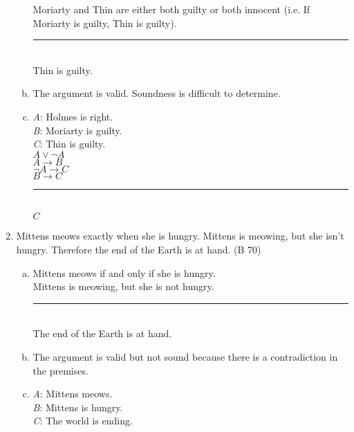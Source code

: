 \documentclass{article}
\begin{document}
\begin{enumerate}
\begin{enumerate}[(a)]
                        Moriarty and Thin are either both guilty or both innocent (i.e. If Moriarty is guilty, Thin is guilty).\\
                        \rule{15em}{.5pt}\\
                        Thin is guilty.
                  \item The argument is valid. Soundness is difficult to determine.
                  \item \textit{A}: Holmes is right.\\
                        \textit{B}: Moriarty is guilty.\\
                        \textit{C}: Thin is guilty.\\

                        $A \lor \neg A$\\
                        $A \to B$\\
                        $\neg A \to C$\\
                        $B \to C$\\
                        \rule{5em}{.5pt}\\
                        $C$
            \end{enumerate}
      \item Mittens meows exactly when she is hungry. Mittens is meowing, but she isn't hungry. Therefore the end of the Earth is at hand. (B 70)
            \begin{enumerate}[(a)]
                  \item Mittens meows if and only if she is hungry.\\
                        Mittens is meowing, but she is not hungry.\\
                        \rule{15em}{.5pt}\\
                        The end of the Earth is at hand.
                  \item The argument is valid but not sound because there is a contradiction in the premises.
                  \item \textit{A}: Mittens meows.\\
                        \textit{B}: Mittens is hungry.\\
                        \textit{C}: The world is ending.\\


\end{enumerate}
\end{enumerate}
\end{document}
